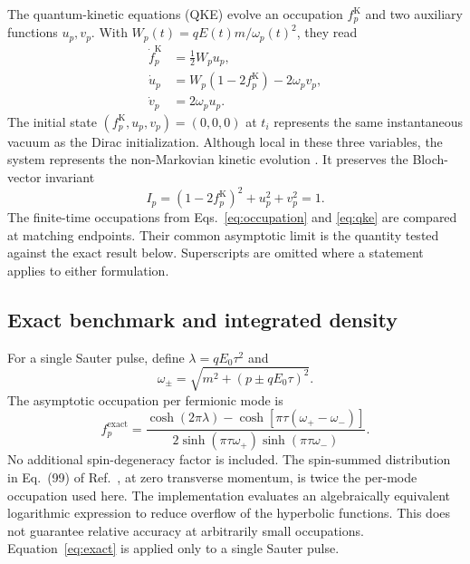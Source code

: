\documentclass[anonymous]{iopjournal}
\begin{document}
The quantum-kinetic equations (QKE) evolve an occupation $f_p^{\mathrm K}$ and two auxiliary functions $u_p,v_p$. With $W_p(t)=qE(t)m/\omega_p(t)^2$, they read
\begin{align}
  \dot f_p^{\mathrm K} &= \frac{1}{2}W_p u_p, \nonumber\\
  \dot u_p &= W_p(1-2f_p^{\mathrm K})-2\omega_p v_p, \label{eq:qke}\\
  \dot v_p &= 2\omega_p u_p. \nonumber
\end{align}
The initial state $(f_p^{\mathrm K},u_p,v_p)=(0,0,0)$ at $t_i$ represents the same instantaneous vacuum as the Dirac initialization. Although local in these three variables, the system represents the non-Markovian kinetic evolution \cite{Schmidt1998,Dumlu2009}. It preserves the Bloch-vector invariant
\begin{equation}
  I_p=(1-2f_p^{\mathrm K})^2+u_p^2+v_p^2=1.
  \label{eq:invariant}
\end{equation}
The finite-time occupations from Eqs.~\eqref{eq:occupation} and \eqref{eq:qke} are compared at matching endpoints. Their common asymptotic limit is the quantity tested against the exact result below. Superscripts are omitted where a statement applies to either formulation.

\subsection{Exact benchmark and integrated density}

For a single Sauter pulse, define $\lambda=qE_0\tau^2$ and
\begin{equation}
  \omega_{\pm}=\sqrt{m^2+(p\pm qE_0\tau)^2}.
\end{equation}
The asymptotic occupation per fermionic mode is \cite{Hebenstreit2010}
\begin{equation}
  f_p^{\mathrm{exact}}=
  \frac{\cosh(2\pi\lambda)-
  \cosh\!\left[\pi\tau(\omega_+-\omega_-)\right]}
  {2\sinh(\pi\tau\omega_+)\sinh(\pi\tau\omega_-)}.
  \label{eq:exact}
\end{equation}
No additional spin-degeneracy factor is included. The spin-summed distribution in Eq.~(99) of Ref.~\cite{Hebenstreit2010}, at zero transverse momentum, is twice the per-mode occupation used here. The implementation evaluates an algebraically equivalent logarithmic expression to reduce overflow of the hyperbolic functions. This does not guarantee relative accuracy at arbitrarily small occupations. Equation~\eqref{eq:exact} is applied only to a single Sauter pulse.
\end{document}
